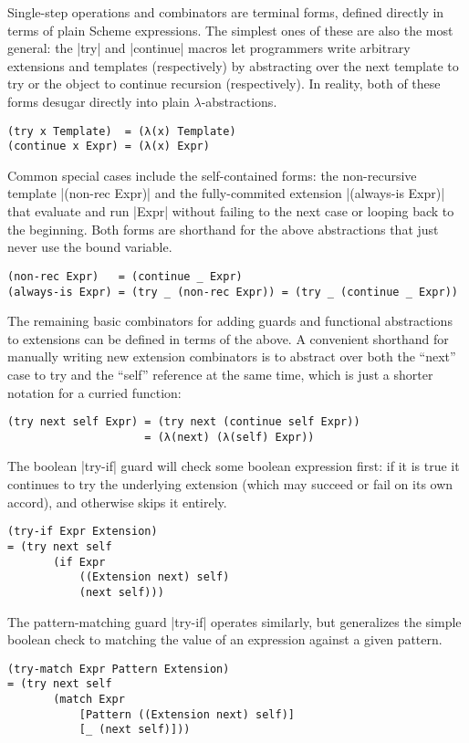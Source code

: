 Single-step operations and combinators are terminal forms, defined directly in terms of plain Scheme expressions.
The simplest ones of these are also the most general:
the \scm|try| and \scm|continue| macros let programmers write arbitrary extensions and templates (respectively) by abstracting over the next template to try or the object to continue recursion (respectively).
In reality, both of these forms desugar directly into plain $\lambda$-abstractions.
\begin{verbatim}
(try x Template)  = (λ(x) Template)
(continue x Expr) = (λ(x) Expr)
\end{verbatim}
Common special cases include the self-contained forms:
the non-recursive template \scm|(non-rec Expr)| and the fully-commited extension \scm|(always-is Expr)| that evaluate and run \scm|Expr| without failing to the next case or looping back to the beginning.
Both forms are shorthand for the above abstractions that just never use the bound variable.
\begin{verbatim}
(non-rec Expr)   = (continue _ Expr)
(always-is Expr) = (try _ (non-rec Expr)) = (try _ (continue _ Expr))
\end{verbatim}

The remaining basic combinators for adding guards and functional abstractions to extensions can be defined in terms of the above.
A convenient shorthand for manually writing new extension combinators is to abstract over both the ``next'' case to try and the ``self'' reference at the same time, which is just a shorter notation for a curried function:
\begin{verbatim}
(try next self Expr) = (try next (continue self Expr))
                     = (λ(next) (λ(self) Expr))
\end{verbatim}
The boolean \scm|try-if| guard will check some boolean expression first:
if it is true it continues to try the underlying extension (which may succeed or fail on its own accord), and otherwise skips it entirely.
\begin{verbatim}
(try-if Expr Extension)
= (try next self
       (if Expr
           ((Extension next) self)
           (next self)))
\end{verbatim}
The pattern-matching guard \scm|try-if| operates similarly, but generalizes the simple boolean check to matching the value of an expression against a given pattern.
\begin{verbatim}
(try-match Expr Pattern Extension)
= (try next self
       (match Expr
           [Pattern ((Extension next) self)]
           [_ (next self)]))
\end{verbatim}

